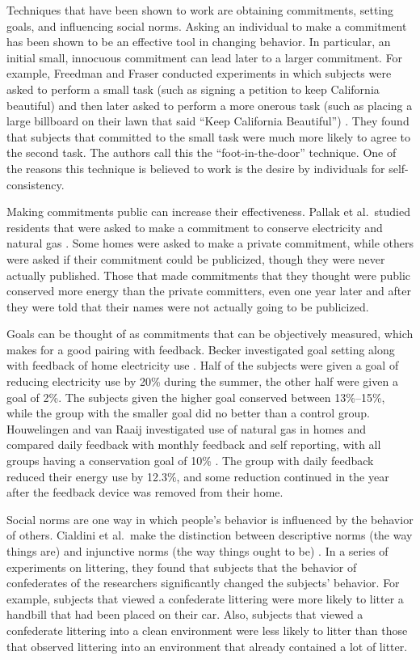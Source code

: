 Techniques that have been shown to work are obtaining commitments, setting goals, and influencing social norms. Asking an individual to make a commitment has been shown to be an effective tool in changing behavior. In particular, an initial small, innocuous commitment can lead later to a larger commitment. For example, Freedman and Fraser conducted experiments in which subjects were asked to perform a small task (such as signing a petition to keep California beautiful) and then later asked to perform a more onerous task (such as placing a large billboard on their lawn that said ``Keep California Beautiful'') \cite{Freedman66}. They found that subjects that committed to the small task were much more likely to agree to the second task. The authors call this the ``foot-in-the-door'' technique. One of the reasons this technique is believed to work is the desire by individuals for self-consistency.

Making commitments public can increase their effectiveness. Pallak et al.\ studied residents that were asked to make a commitment to conserve electricity and natural gas \cite{Pallak80}. Some homes were asked to make a private commitment, while others were asked if their commitment could be publicized, though they were never actually published. Those that made commitments that they thought were public conserved more energy than the private committers, even one year later and after they were told that their names were not actually going to be publicized.

Goals can be thought of as commitments that can be objectively measured, which makes for a good pairing with feedback. Becker investigated goal setting along with feedback of home electricity use \cite{Becker78}. Half of the subjects were given a goal of reducing electricity use by 20\% during the summer, the other half were given a goal of 2\%. The subjects given the higher goal conserved between 13\%--15\%, while the group with the smaller goal did no better than a control group. Houwelingen and van Raaij investigated use of natural gas in homes and compared daily feedback with monthly feedback and self reporting, with all groups having a conservation goal of 10\% \cite{Houwelingen89}. The group with daily feedback reduced their energy use by 12.3\%, and some reduction continued in the year after the feedback device was removed from their home.

Social norms are one way in which people's behavior is influenced by the behavior of others. Cialdini et al.\ make the distinction between descriptive norms (the way things are) and injunctive norms (the way things ought to be) \cite{Cialdini90}. In a series of experiments on littering, they found that subjects that the behavior of confederates of the researchers significantly changed the subjects' behavior. For example, subjects that viewed a confederate littering were more likely to litter a handbill that had been placed on their car. Also, subjects that viewed a confederate littering into a clean environment were less likely to litter than those that observed littering into an environment that already contained a lot of litter.

